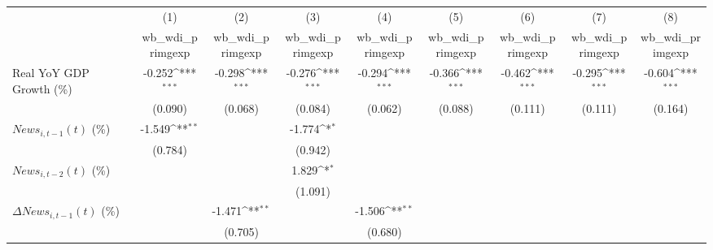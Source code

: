 {
\def\sym#1{\ifmmode^{#1}\else\(^{#1}\)\fi}
\begin{tabular}{l*{8}{c}}
\toprule
                    &\multicolumn{1}{c}{(1)}&\multicolumn{1}{c}{(2)}&\multicolumn{1}{c}{(3)}&\multicolumn{1}{c}{(4)}&\multicolumn{1}{c}{(5)}&\multicolumn{1}{c}{(6)}&\multicolumn{1}{c}{(7)}&\multicolumn{1}{c}{(8)}\\
                    &\multicolumn{1}{c}{wb_wdi_primgexp}&\multicolumn{1}{c}{wb_wdi_primgexp}&\multicolumn{1}{c}{wb_wdi_primgexp}&\multicolumn{1}{c}{wb_wdi_primgexp}&\multicolumn{1}{c}{wb_wdi_primgexp}&\multicolumn{1}{c}{wb_wdi_primgexp}&\multicolumn{1}{c}{wb_wdi_primgexp}&\multicolumn{1}{c}{wb_wdi_primgexp}\\
\midrule
Real YoY GDP Growth (\%)&      -0.252\sym{***}&      -0.298\sym{***}&      -0.276\sym{***}&      -0.294\sym{***}&      -0.366\sym{***}&      -0.462\sym{***}&      -0.295\sym{***}&      -0.604\sym{***}\\
                    &     (0.090)         &     (0.068)         &     (0.084)         &     (0.062)         &     (0.088)         &     (0.111)         &     (0.111)         &     (0.164)         \\
\addlinespace
$ News_{i,t-1}(t)$ (\%)&      -1.549\sym{**} &                     &      -1.774\sym{*}  &                     &                     &                     &                     &                     \\
                    &     (0.784)         &                     &     (0.942)         &                     &                     &                     &                     &                     \\
\addlinespace
$ News_{i,t-2}(t)$ (\%)&                     &                     &       1.829\sym{*}  &                     &                     &                     &                     &                     \\
                    &                     &                     &     (1.091)         &                     &                     &                     &                     &                     \\
\addlinespace
$ \Delta News_{i,t-1}(t)$ (\%)&                     &      -1.471\sym{**} &                     &      -1.506\sym{**} &                     &                     &                     &                     \\
                    &                     &     (0.705)         &                     &     (0.680)         &                     &                     &                     &                     \\

\end{tabular}}
